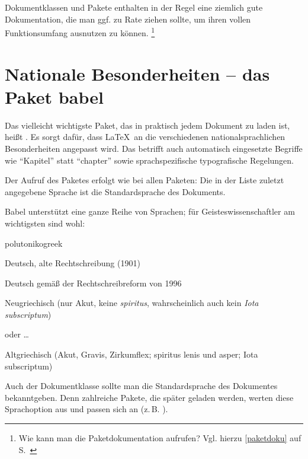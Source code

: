 Dokumentklassen und Pakete enthalten in der Regel eine ziemlich gute Dokumentation, die man
ggf. zu Rate ziehen sollte, um ihren vollen Funktionsumfang ausnutzen zu können.%
\footnote{Wie kann man die Paketdokumentation aufrufen? 
    Vgl. hierzu \ref{paketdoku} auf S.~\pageref{paketdoku} }


\section{Nationale Besonderheiten -- das Paket babel}
\label{babel}


Das vielleicht wichtigste Paket, das in praktisch jedem Dokument zu laden ist, heißt .
Es sorgt dafür, dass \LaTeX\ an die verschiedenen nationalsprachlichen Besonderheiten angepasst wird.
Das betrifft auch automatisch eingesetzte Begriffe wie \enquote{Kapitel} statt \enquote{chapter} sowie
sprachspezifische typografische Regelungen.

Der Aufruf des Paketes  erfolgt wie bei allen Paketen: 
Die in der Liste zuletzt angegebene Sprache ist die Standardsprache des Dokuments. 

Babel unterstützt eine ganze Reihe von Sprachen; für Geisteswissenschaftler am wichtigsten sind
wohl:

\begin{labeling}{polutonikogreek}
 \item[german] Deutsch, alte Rechtschreibung (1901)
 \item[ngerman] Deutsch gemäß der Rechtschreibreform von 1996
 \item[greek] Neugriechisch (nur Akut, keine \emph{spiritus}, wahrscheinlich auch kein \emph{Iota subscriptum})
 \item[greek.ancient] oder \ldots 
 \item[polutonikogreek] Altgriechisch (Akut, Gravis, Zirkumflex; spiritus lenis und asper; Iota subscriptum)
\end{labeling}


Auch der Dokumentklasse sollte man die Standardsprache des Dokumentes bekanntgeben.
Denn zahlreiche Pakete, die später geladen werden, werten diese Sprachoption aus und 
passen sich an (z.\,B. ).

